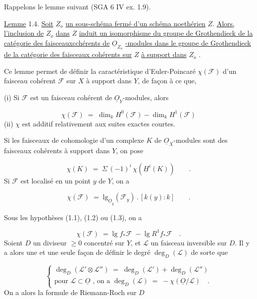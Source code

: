 Rappelons le lemme suivant (SGA 6 IV ex. 1.9).

\underline{Lemme} 1.4. \underline{Soit} $Z_o$ \underline{un sous-schéma fermé d'un schéma noethérien} $Z$. \underline{Alors, l'inclusion de} $Z_o$ \underline{dans} $Z$ \underline{induit un isomorphisme du groupe de Grothendieck de la catégorie des faisceauxcchérents de} $\underline{O}_{Z_o}$ \underline{-modules dans le groupe de Grothendieck de la catégorie des faisceaux cohérents sur} $Z$ \underline{à support dans} $Z_o$ .

Ce lemme permet de définir la caractéristique d'Euler-Poincaré $\chi(\mathcal{F})$ d'un faisceau cohérent $\mathcal{F}$ sur $X$ à support dans $Y$, de façon à ce que,

(i) Si $\mathcal{F}$ est un faisceau cohérent de $\underline{O}_Y$-modules, alors

\begin{equation}\tag{1.4.1}
\chi(\mathcal{F}) \;=\; \dim_k H^0(\mathcal{F}) - \dim_k H^1(\mathcal{F})
\end{equation}
(ii) $\chi$ est additif relativement aux suites exactes courtes.

Si les faisceaux de cohomologie d'un complexe $K$ de $\underline{O}_X$-modules sont des faisceaux cohérents à support dans $Y$, on pose

\begin{equation}\tag{1.4.2}
\chi(K) \;=\; \Sigma \, (-1)^i \, \chi(\underline{H}^i(K)) \qquad .
\end{equation}
Si $\mathcal{F}$ est localisé en un point $y$ de $Y$, on a

\begin{equation}\tag{1.4.3}
\chi(\mathcal{F}) \;=\; \mathrm{lg}_{\underline{O}_y}(\mathcal{F}_y) \, . \, [k(y) : k] \qquad .
\end{equation}


Sous les hypothèses (1.1), (1.2) ou (1.3), on a

\begin{equation}\tag{1.4.4}
\chi(\mathcal{F}) \;=\; \mathrm{lg}\; f_{*}\mathcal{F} \;-\; \mathrm{lg}\; R^{1}f_{*}\mathcal{F} \quad .
\end{equation}
Soient $D$ un diviseur $\geq 0$ concentré sur $Y$, et $\mathcal{L}$ un faisceau inversible sur $D$. Il y a alors une et une seule façon de définir le degré $\deg_D(\mathcal{L})$ de sorte que

\begin{equation}\tag{1.4.5}
\left\{
\begin{array}{l}
\deg_D(\mathcal{L}' \otimes \mathcal{L}'') \;=\; \deg_D(\mathcal{L}') + \deg_D(\mathcal{L}'') \\[3ex]
\text{pour } \mathcal{L} \subset \underline{O} \text{ , on a } \deg_D(\mathcal{L}) \;=\; - \chi(\underline{O}/\mathcal{L}) \quad .
\end{array}
\right.
\end{equation}
On a alors la formule de Riemann-Roch sur $D$

